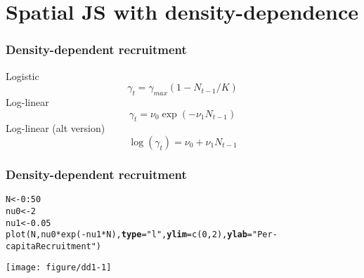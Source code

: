 \documentclass[color=usenames,dvipsnames]{beamer}\usepackage[]{graphicx}\usepackage[]{color}
\makeatletter
\newcommand{\hlnum}[1]{\textcolor[rgb]{0.69,0.494,0}{#1}}%
\newcommand{\hlstr}[1]{\textcolor[rgb]{0.749,0.012,0.012}{#1}}%
\newcommand{\hlopt}[1]{\textcolor[rgb]{0,0,0}{#1}}%
\newcommand{\hlstd}[1]{\textcolor[rgb]{0,0,0}{#1}}%
\newcommand{\hlkwb}[1]{\textcolor[rgb]{0,0.341,0.682}{#1}}%
\newcommand{\hlkwc}[1]{\textcolor[rgb]{0,0,0}{\textbf{#1}}}%
\newcommand{\hlkwd}[1]{\textcolor[rgb]{0.004,0.004,0.506}{#1}}%
\newenvironment{kframe}{%
 \def\at@end@of@kframe{}%
 \ifinner\ifhmode%
  \def\at@end@of@kframe{\end{minipage}}%
  \begin{minipage}{\columnwidth}%
 \fi\fi%
 \def\FrameCommand##1{\hskip\@totalleftmargin \hskip-\fboxsep
 \colorbox{shadecolor}{##1}\hskip-\fboxsep
     \hskip-\linewidth \hskip-\@totalleftmargin \hskip\columnwidth}%
 \MakeFramed {\advance\hsize-\width
   \@totalleftmargin\z@ \linewidth\hsize
   \@setminipage}}%
 {\par\unskip\endMakeFramed%
 \at@end@of@kframe}
\newenvironment{knitrout}{}{} %
\makeatother
\begin{document}
\section{Spatial JS with density-dependence}







\begin{frame}
  \frametitle{Density-dependent recruitment}
  \large
  {Logistic}
  \[
     \gamma_t = \gamma_{max}(1 - N_{t-1}/K)
  \]
  \vfill
  {Log-linear}
  \[
     \gamma_t = \nu_0\exp(-\nu_1 N_{t-1})
  \]
  \vfill
  {Log-linear (alt version)}
  \[
    \log(\gamma_t) = \nu_0 + \nu_1 N_{t-1}
  \]
\end{frame}






\begin{frame}[fragile]
  \frametitle{Density-dependent recruitment}
  \tiny
\begin{knitrout}
\color{fgcolor}\begin{kframe}
\begin{alltt}
\hlstd{N} \hlkwb{<-} \hlnum{0}\hlopt{:}\hlnum{50}
\hlstd{nu0} \hlkwb{<-} \hlnum{2}
\hlstd{nu1} \hlkwb{<-} \hlnum{0.05}
\hlkwd{plot}\hlstd{(N, nu0}\hlopt{*}\hlkwd{exp}\hlstd{(}\hlopt{-}\hlstd{nu1}\hlopt{*}\hlstd{N),} \hlkwc{type}\hlstd{=}\hlstr{"l"}\hlstd{,} \hlkwc{ylim}\hlstd{=}\hlkwd{c}\hlstd{(}\hlnum{0}\hlstd{,}\hlnum{2}\hlstd{),} \hlkwc{ylab}\hlstd{=}\hlstr{"Per-capita Recruitment"}\hlstd{)}
\end{alltt}
\end{kframe}

{\centering \texttt{[image: figure/dd1-1]} 

}



\end{knitrout}
\end{frame}
\end{document}
